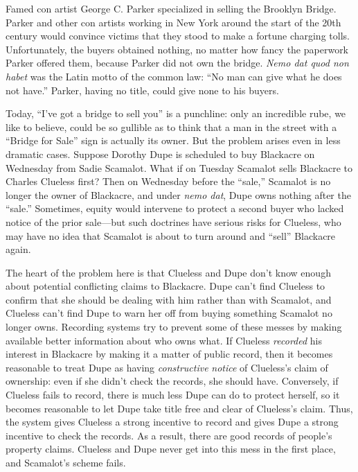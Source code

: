 Famed con artist George C. Parker specialized in selling the Brooklyn Bridge.
Parker and other con artists working in New York around the start of the 20th
century would convince victims that they stood to make a fortune charging
tolls. Unfortunately, the buyers obtained nothing, no matter how fancy the
paperwork Parker offered them, because Parker did not own the bridge.
\textit{Nemo dat quod non habet} was the Latin motto of the common law: ``No
man can give what he does not have.'' Parker, having no title, could give none
to his buyers.

Today, ``I've got a bridge to sell you'' is a punchline: only an incredible
rube, we like to believe, could be so gullible as to think that a man in the
street with a ``Bridge for Sale'' sign is actually its owner. But the problem
arises even in less dramatic cases. Suppose Dorothy Dupe is scheduled to buy
Blackacre on Wednesday from Sadie Scamalot. What if on Tuesday Scamalot sells
Blackacre to Charles Clueless first? Then on Wednesday before the ``sale,''
Scamalot is no longer the owner of Blackacre, and under \textit{nemo dat}, Dupe
owns nothing after the ``sale.'' Sometimes, equity would intervene to protect a
second buyer who lacked notice of the prior sale---but such doctrines have
serious risks for Clueless, who may have no idea that Scamalot is about to turn
around and ``sell'' Blackacre again.

The heart of the problem here is that Clueless and Dupe don't know enough about
potential conflicting claims to Blackacre. Dupe can't find Clueless to confirm
that she should be dealing with him rather than with Scamalot, and Clueless
can't find Dupe to warn her off from buying something Scamalot no longer owns.
Recording systems try to prevent some of these messes by making available
better information about who owns what. If Clueless \textit{recorded} his
interest in Blackacre by making it a matter of public record, then it becomes
reasonable to treat Dupe as having \textit{constructive} \textit{notice} of
Clueless's claim of ownership: even if she didn't check the records, she should
have. Conversely, if Clueless fails to record, there is much less Dupe can do
to protect herself, so it becomes reasonable to let Dupe take title free and
clear of Clueless's claim. Thus, the system gives Clueless a strong incentive
to record and gives Dupe a strong incentive to check the records. As a result,
there are good records of people's property claims. Clueless and Dupe never get
into this mess in the first place, and Scamalot's scheme fails.

